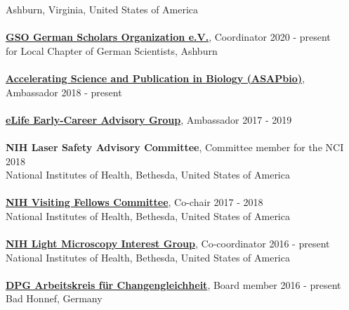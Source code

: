 \documentclass[margin,line]{res}
\begin{document}
\begin{resume}
Ashburn, Virginia, United States of America\\
\vspace*{-3mm}\\
{\bf \href{https://www.gain-network.org/en/about-gain/gain-chapters/}{GSO German Scholars Organization e.V.}}, Coordinator  \hfill {2020 - present}\\
for Local Chapter of German Scientists, Ashburn\\
\vspace*{-3mm}\\
{\bf \href{https://asapbio.org/preprint-info/preprint-stories}{Accelerating Science and Publication in Biology (ASAPbio)}}, Ambassador \hfill {2018 - present}\\
\vspace*{-3mm}\\
{\bf \href{hhttps://elifesciences.org/inside-elife/912b0679/early-career-advisory-group-elife-welcomes-150-ambassadors-of-good-practice-in-science}{eLife Early-Career Advisory Group}}, Ambassador \hfill {2017 - 2019}\\
\vspace*{-3mm}\\
{\bf NIH Laser Safety Advisory Committee}, Committee member for the NCI \hfill {2018}\\
National Institutes of Health, Bethesda, United States of America\\
\vspace*{-3mm}\\
{\bf \href{https://www.training.nih.gov/felcom/visitingfellows2}{NIH Visiting Fellows Committee}}, Co-chair \hfill {2017 - 2018}\\
National Institutes of Health, Bethesda, United States of America\\
\vspace*{-3mm}\\
{\bf \href{https://confocal.ccr.cancer.gov/light-microscopy-interest-group/}{ NIH Light Microscopy Interest Group}}, Co-coordinator \hfill {2016 - present}\\
National Institutes of Health, Bethesda, United States of America\\
\vspace*{-3mm}\\
{\bf  \href{https://www.dpg-physik.de/vereinigungen/fachuebergreifend/ak/akc}{DPG Arbeitskreis für Changengleichheit}}, Board member \hfill {2016 - present}\\
Bad Honnef, Germany\\
\vspace*{-3mm}\\

\end{resume}
\end{document}
